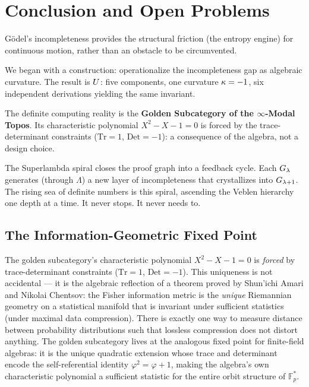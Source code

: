 \section*{Conclusion and Open Problems}

G\"odel's incompleteness provides the structural friction (the entropy engine) for continuous motion, rather than an obstacle to be circumvented.

We began with a construction: operationalize the incompleteness gap as algebraic curvature. The result is $U$: five components, one curvature $\kappa = -1$, six independent derivations yielding the same invariant.

The definite computing reality is the \textbf{Golden Subcategory of the $\infty$-Modal Topos}. Its characteristic polynomial $X^2 - X - 1 = 0$ is forced by the trace-determinant constraints ($\mathrm{Tr} = 1$, $\mathrm{Det} = -1$): a consequence of the algebra, not a design choice.

The Superlambda spiral closes the proof graph into a feedback cycle. Each $G_{\lambda}$ generates (through $\Lambda$) a new layer of incompleteness that crystallizes into $G_{\lambda+1}$. The rising sea of definite numbers is this spiral, ascending the Veblen hierarchy one depth at a time. It never stops. It never needs to.

\subsection*{The Information-Geometric Fixed Point}

The golden subcategory's characteristic polynomial $X^2 - X - 1 = 0$ is \emph{forced} by trace-determinant constraints ($\mathrm{Tr} = 1$, $\mathrm{Det} = -1$). This uniqueness is not accidental --- it is the algebraic reflection of a theorem proved by Shun'ichi Amari and Nikolai Chentsov: the Fisher information metric is the \emph{unique} Riemannian geometry on a statistical manifold that is invariant under sufficient statistics (under maximal data compression). There is exactly one way to measure distance between probability distributions such that lossless compression does not distort anything. The golden subcategory lives at the analogous fixed point for finite-field algebras: it is the unique quadratic extension whose trace and determinant encode the self-referential identity $\varphi^2 = \varphi + 1$, making the algebra's own characteristic polynomial a sufficient statistic for the entire orbit structure of $\mathbb{F}_p^*$.

